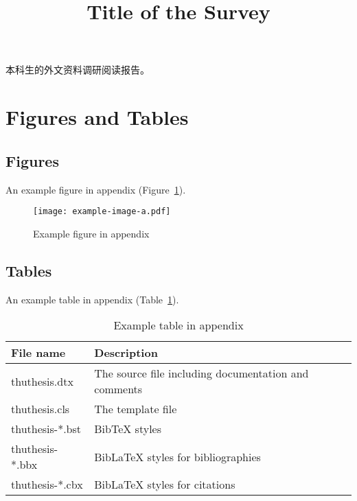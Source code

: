 
\begin{survey}
\label{cha:survey}

\title{Title of the Survey}
\maketitle


\tableofcontents


本科生的外文资料调研阅读报告。


\section{Figures and Tables}

\subsection{Figures}

An example figure in appendix (Figure~\ref{fig:appendix-survey-figure}).

\begin{figure}
  \centering
  \texttt{[image: example-image-a.pdf]}
  \caption{Example figure in appendix}
  \label{fig:appendix-survey-figure}
\end{figure}


\subsection{Tables}

An example table in appendix (Table~\ref{tab:appendix-survey-table}).

\begin{table}
  \centering
  \caption{Example table in appendix}
  \begin{tabular}{ll}
    \toprule
    File name       & Description                                         \\
    \midrule
    thuthesis.dtx   & The source file including documentation and comments \\
    thuthesis.cls   & The template file                                   \\
    thuthesis-*.bst & BibTeX styles                                       \\
    thuthesis-*.bbx & BibLaTeX styles for bibliographies                  \\
    thuthesis-*.cbx & BibLaTeX styles for citations                       \\
    \bottomrule
  \end{tabular}
  \label{tab:appendix-survey-table}
\end{table}



\end{survey}
